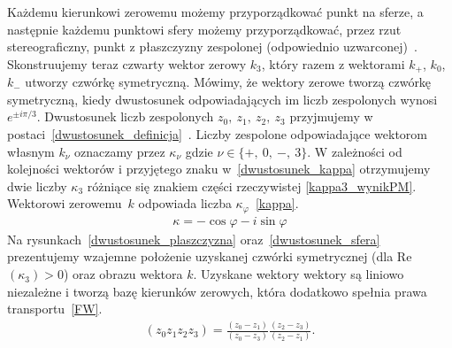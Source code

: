 Każdemu kierunkowi zerowemu możemy przyporządkować punkt na sferze,
a następnie każdemu punktowi sfery możemy przyporządkować,
przez rzut stereograficzny, 
punkt z płaszczyzny zespolonej 
(odpowiednio uzwarconej)~\cite{star1993algebra}.
Skonstruujemy teraz czwarty wektor zerowy $k_3$, który razem z 
wektorami $k_+$, $k_0$, $k_-$ utworzy czwórkę symetryczną.
Mówimy, że wektory zerowe tworzą czwórkę symetryczną,
 kiedy dwustosunek odpowiadających im liczb zespolonych 
 wynosi $e^{\pm i\pi/3}$.  
Dwustosunek liczb zespolonych $z_0,\ z_1,\ z_2,\ z_3$ przyjmujemy w 
postaci~\eqref{dwustosunek_definicja}~\cite{star1993algebra}.
Liczby zespolone odpowiadające wektorom własnym $k_\nu$ oznaczamy
przez $\kappa_\nu$ gdzie $\nu \in \{+,\ 0,\ -,\ 3\}$.
W zależności od kolejności wektorów i 
przyjętego znaku w~\eqref{dwustosunek_kappa}
otrzymujemy dwie liczby $\kappa_3$ różniące się znakiem części 
rzeczywistej \eqref{kappa3_wynikPM}. 
Wektorowi zerowemu~$k$ odpowiada liczba $\kappa_\varphi$~\eqref{kappa}.
\begin{align}\label{kappa}
\kappa = -\cos\varphi - i \sin \varphi
\end{align}
Na rysunkach~\ref{dwustosunek_plaszczyzna} oraz~\ref{dwustosunek_sfera} 
prezentujemy wzajemne położenie 
uzyskanej czwórki symetrycznej (dla Re$ (\kappa_3) >0$) 
oraz obrazu wektora $k$. 
Uzyskane wektory wektory są liniowo niezależne i tworzą bazę 
kierunków zerowych, która dodatkowo spełnia 
prawa transportu~\eqref{FW}.
\begin{align}\label{dwustosunek_definicja}
(z_0z_1z_2z_3) = 
\frac{(z_0-z_1)}{(z_0-z_3)} 
\frac{(z_2-z_3)}{(z_2 -z_1)} .
\end{align}
